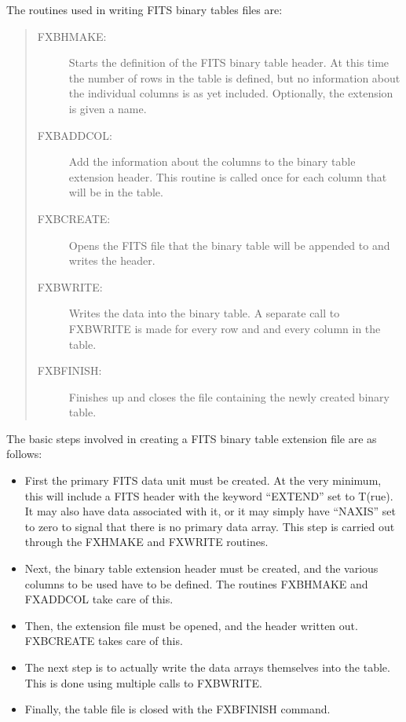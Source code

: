 The routines used in writing FITS binary tables files are:
\begin{quote}
\begin{description}
\item[FXBHMAKE:]
Starts the definition of the FITS binary table header.  At this time the number
of rows in the table is defined, but no information about the individual
columns is as yet included.  Optionally, the extension is given a name.
\item[FXBADDCOL:]
Add the information about the columns to the binary table extension header.
This routine is called once for each column that will be in the table.
\item[FXBCREATE:]
Opens the FITS file that the binary table will be appended to and writes the
header.
\item[FXBWRITE:]
Writes the data into the binary table.  A separate call to FXBWRITE is made for
every row and and every column in the table.
\item[FXBFINISH:]
Finishes up and closes the file containing the newly created binary table.
\end{description}
\end{quote}

The basic steps involved in creating a FITS binary table extension file are as
follows:
%
\begin{itemize}
\item
	First the primary FITS data unit must be created.  At the very minimum,
	this will include a FITS header with the keyword ``EXTEND'' set to
	T(rue).  It may also have data associated with it, or it may simply
	have ``NAXIS'' set to zero to signal that there is no primary data
	array.  This step is carried out through the FXHMAKE and FXWRITE
	routines.
\item
	Next, the binary table extension header must be created, and the
	various columns to be used have to be defined.  The routines FXBHMAKE
	and FXADDCOL take care of this.
\item
	Then, the extension file must be opened, and the header written out.
	FXBCREATE takes care of this.
\item
	The next step is to actually write the data arrays themselves into the
	table.  This is done using multiple calls to FXBWRITE.
\item
	Finally, the table file is closed with the FXBFINISH command.
\end{itemize}

